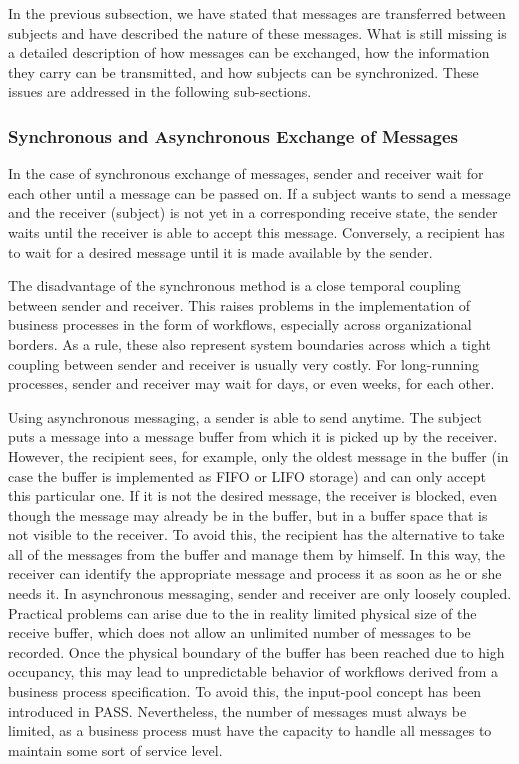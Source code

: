 In the previous subsection, we have stated that messages are transferred between subjects and have described the nature of these messages. What is still missing is a detailed description of how messages can be exchanged, how the information they carry can be transmitted, and how subjects can be synchronized. These issues are addressed in the following sub-sections.

\subsubsection{Synchronous and Asynchronous Exchange of Messages}

In the case of synchronous exchange of messages, sender and receiver wait for each other until a message can be passed on. If a subject wants to send a message and the receiver (subject) is not yet in a corresponding receive state, the sender waits until the receiver is able to accept this message. Conversely, a recipient has to wait for a desired message until it is made available by the sender.

The disadvantage of the synchronous method is a close temporal coupling between sender and receiver. This raises problems in the implementation of business processes in the form of workflows, especially across organizational borders. As a rule, these also represent system boundaries across which a tight coupling between sender and receiver is usually very costly. For long-running processes, sender and receiver may wait for days, or even weeks, for each other.

Using asynchronous messaging, a sender is able to send anytime. The subject puts a message into a message buffer from which it is picked up by the receiver. However, the recipient sees, for example, only the oldest message in the buffer (in case the buffer is implemented as FIFO or LIFO storage) and can only accept this particular one. If it is not the desired message, the receiver is blocked, even though the message may already be in the buffer, but in a buffer space that is not visible to the receiver. To avoid this, the recipient has the alternative to take all of the messages from the buffer and manage them by himself. In this way, the receiver can identify the appropriate message and process it as soon as he or she needs it. In asynchronous messaging, sender and receiver are only loosely coupled. Practical problems can arise due to the in reality limited physical size of the receive buffer, which does not allow an unlimited number of messages to be recorded. Once the physical boundary of the buffer has been reached due to high occupancy, this may lead to unpredictable behavior of workflows derived from a business process specification. To avoid this, the input-pool concept has been introduced in PASS. Nevertheless, the number of messages must always be limited, as a business process must have the capacity to handle all messages to maintain some sort of service level.


